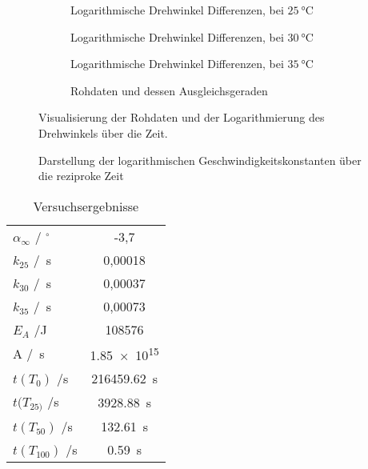 \begin{figure}
\centering
	\begin{subfigure}{0.4\textwidth}
	
	\caption{Logarithmische Drehwinkel Differenzen, bei $\qty{25}{\degreeCelsius}$}
	\label{abb:e25}
	\end{subfigure}
\hspace{5mm}	
	\begin{subfigure}{0.4\textwidth}
	
	\caption{Logarithmische Drehwinkel Differenzen, bei $\qty{30}{\degreeCelsius}$}
	\label{abb:e30}
	\end{subfigure}
\hfill
	\begin{subfigure}{0.4\textwidth}
	
	\caption{Logarithmische Drehwinkel Differenzen, bei $\qty{35}{\degreeCelsius}$}
	\label{abb:e35}
	\end{subfigure}
\hspace{5mm}
	\begin{subfigure}{0.4\textwidth}
	
	\caption{Rohdaten und dessen Ausgleichsgeraden}
	\label{abb:Rohdaten}
	\end{subfigure}
\caption{Visualisierung der Rohdaten und der Logarithmierung des Drehwinkels über die Zeit.}
\end{figure}
\begin{figure}
\centering

\caption{Darstellung der logarithmischen Geschwindigkeitskonstanten über die reziproke Zeit}
\label{abb:EA}
\end{figure}

\begin{table}[b]  
	\centering
	\begin{tabular}{l|c}
\hline
$\alpha_\infty$ / $^\circ$		& -3,7 		\\	
$k_{25}$	/\unit{\per\second}	& 0,00018 	\\
$k_{30}$	/\unit{\per\second}	& 0,00037 	\\
$k_{35}$	/\unit{\per\second}	& 0,00073 	\\
$E_A$ 		/\unit{\joule}	 	& 108576	\\
A 		/\unit{\per\second}	& \qty{1,85e15}{}\\
$t(T_0)$ 	/\unit{\second}		& \qty{216459,62}{\second}\\
$t(T_{25)}$ 	/\unit{\second}		& \qty{3928,88}{\second}\\
$t(T_{50})$ 	/\unit{\second}		& \qty{132,61}{\second}\\
$t(T_{100})$ 	/\unit{\second}		& \qty{0,59}{\second}\\
\hline
	\end{tabular}
\caption{Versuchsergebnisse}
\label{tab:ergebnisse}
\end{table}
